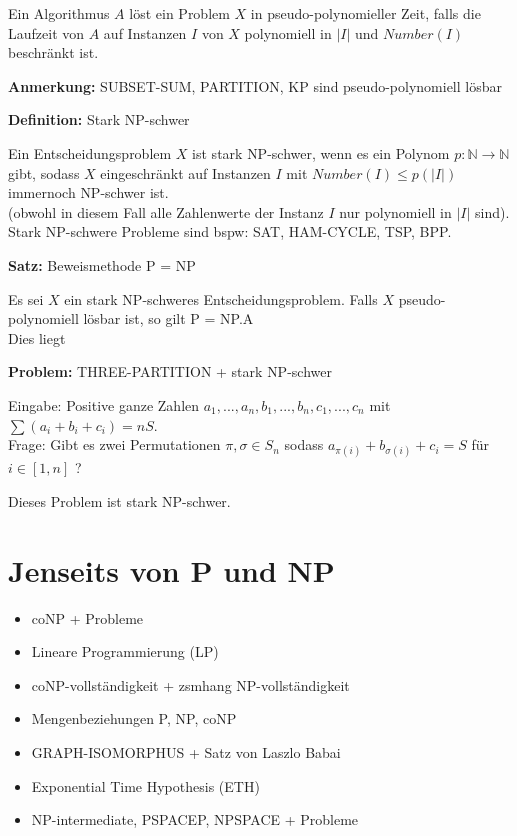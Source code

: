 \documentclass[a4paper,graphics,11pt]{article}
\begin{document}
Ein Algorithmus $A$ löst ein Problem $X$ in pseudo-polynomieller Zeit, falls die Laufzeit von
$A$ auf Instanzen $I$ von $X$ polynomiell in $|I|$ und $Number(I)$ beschränkt ist.

\strut

\textbf{Anmerkung:} SUBSET-SUM, PARTITION, KP sind pseudo-polynomiell lösbar

\strut

\textbf{Definition:} Stark \textsf{NP}-schwer

Ein Entscheidungsproblem $X$ ist stark \textsf{NP}-schwer, wenn es ein Polynom $p : \mathbb{N}\to \mathbb{N}$
gibt, sodass $X$ eingeschränkt auf Instanzen $I$ mit $Number(I) \leq p(|I|)$ immernoch \textsf{NP}-schwer ist.\\
(obwohl in diesem Fall alle Zahlenwerte der Instanz $I$ nur polynomiell in $|I|$ sind).\\
Stark \textsf{NP}-schwere Probleme sind bspw: SAT, HAM-CYCLE, TSP, BPP.

\strut

\textbf{Satz:} Beweismethode \textsf{P = NP}

Es sei $X$ ein stark \textsf{NP}-schweres Entscheidungsproblem. Falls $X$ pseudo-polynomiell lösbar ist,
so gilt \textsf{P = NP}.A\\
Dies liegt

\strut

\textbf{Problem:} THREE-PARTITION + stark \textsf{NP}-schwer

Eingabe: Positive ganze Zahlen $a_1,...,a_n,b_1,...,b_n,c_1,...,c_n$ mit $\sum (a_i+b_i+c_i) = nS$.\\[5pt]
Frage: Gibt es zwei Permutationen $\pi,\sigma \in S_n$ sodass $a_{\pi(i)} + b_{\sigma(i)} + c_i = S$
für $i \in [1,n]$ ?

Dieses Problem ist stark \textsf{NP}-schwer.

\newpage

\section{Jenseits von \textsf{P} und \textsf{NP}}

\begin{itemize}
    \item \textsf{coNP} + Probleme
    \item Lineare Programmierung (LP)
    \item \textsf{coNP}-vollständigkeit + zsmhang \textsf{NP}-vollständigkeit
    \item Mengenbeziehungen \textsf{P}, \textsf{NP}, \textsf{coNP}
    \item GRAPH-ISOMORPHUS + Satz von Laszlo Babai
    \item Exponential Time Hypothesis (ETH)
    \item \textsf{NP}-intermediate, \textsf{PSPACEP}, \textsf{NPSPACE} + Probleme
\end{itemize}
\end{document}
